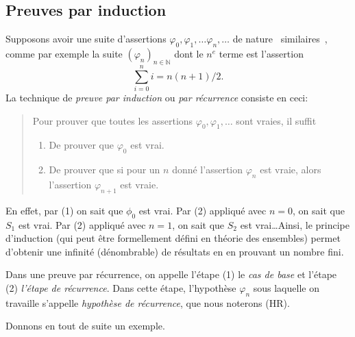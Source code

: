 \documentclass[french,course,oneside,theoremnosection]{lecture}
\newenvironment{further}[1]
{\begin{tcolorbox}[colframe=gray!50, colback=gray!5, arc=0pt, outer arc=0pt, boxrule=0.5pt, title=#1, breakable]}
{\end{tcolorbox}}
\newcommand{\N}{\mathbb{N}}
\begin{document}
\subsection{Preuves par induction}
Supposons avoir une suite d'assertions $\varphi_0, \varphi_1, \ldots \varphi_n, \ldots$ de nature \og~similaires~\fg{}, comme par exemple la suite $(\varphi_n)_{n\in \N}$ dont le $n^{e}$ terme est l'assertion \[\sum_{i=0}^ni=n(n+1)/2.\]
La technique de \emph{preuve par induction} ou \emph{par récurrence} consiste en ceci:
\begin{quotation}
Pour prouver que toutes les assertions $\varphi_0, \varphi_1, \ldots $ sont vraies, il suffit
\begin{enumerate}[(1)]
\item De prouver que $\varphi_0$ est vrai.
\item De prouver que si pour un $n$ donné l'assertion $\varphi_n$ est vraie, alors l'assertion $\varphi_{n+1}$ est vraie.
\end{enumerate}
\end{quotation} 

En effet, par (1) on sait que $\phi_0$ est vrai. Par (2) appliqué avec $n=0$, on sait que $S_1$ est vrai. Par (2) appliqué avec $n=1$, on sait que $S_2$ est vrai\ldots Ainsi, le principe d'induction (qui peut être formellement défini en théorie des ensembles) permet d'obtenir une infinité (dénombrable) de résultats en en prouvant un nombre fini.

Dans une preuve par récurrence, on appelle l'étape (1) le \emph{cas de base} et l'étape (2) \emph{l'étape de récurrence}. Dans cette étape, l'hypothèse $\varphi_n$ sous laquelle on travaille s'appelle \emph{hypothèse de récurrence}, que nous noterons (HR).


Donnons en tout de suite un exemple.
\end{document}
